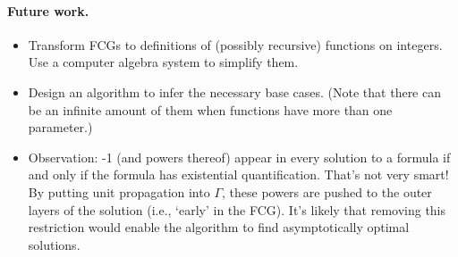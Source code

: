 \documentclass{article}
\theoremstyle{definition}
\theoremstyle{remark}
\begin{document}
\paragraph{Future work.}
\begin{itemize}
\item Transform FCGs to definitions of (possibly recursive) functions on integers. Use a computer algebra system to simplify them.
\item Design an algorithm to infer the necessary base cases. (Note that there can be an infinite amount of them when functions have more than one parameter.)
\item Observation: -1 (and powers thereof) appear in every solution to a formula if and only if the formula has existential quantification. That's not very smart! By putting unit propagation into $\Gamma$, these powers are pushed to the outer layers of the solution (i.e., `early' in the FCG). It's likely that removing this restriction would enable the algorithm to find asymptotically optimal solutions.
\end{itemize}



\end{document}
